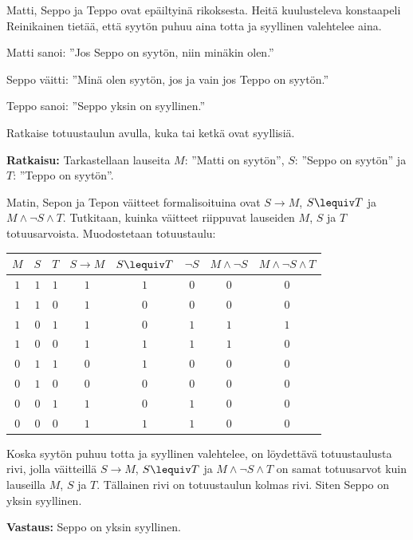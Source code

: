 \begin{esimerkki}
Matti, Seppo ja Teppo ovat epäiltyinä rikoksesta. Heitä kuulusteleva konstaapeli Reinikainen tietää, että syytön puhuu aina totta ja syyllinen valehtelee aina.

Matti sanoi: ''Jos Seppo on syytön, niin minäkin olen.''

Seppo väitti: ''Minä olen syytön, jos ja vain jos Teppo on syytön.''

Teppo sanoi: ''Seppo yksin on syyllinen.'' 

Ratkaise totuustaulun avulla, kuka tai ketkä ovat syyllisiä.

{\bf Ratkaisu:} Tarkastellaan lauseita $M$: ''Matti on syytön'', $S$: ''Seppo on syytön'' ja $T$: ''Teppo on syytön''.

Matin, Sepon ja Tepon väitteet formalisoituina ovat $S\to M$, $S\lequiv T$
ja $M\land \lnot S \land T$. Tutkitaan, kuinka väitteet riippuvat lauseiden $M$, $S$ ja $T$ totuusarvoista. Muodostetaan totuustaulu:

\bigskip

\begin{center}
\begin{tabular}{|c|c|c|c|c|c|c|c|}\hline
$M$ & $S$ & $T$ & $S\to M$ & $S\lequiv T$ & $\lnot S$ & $M\land \lnot S$ & $M\land \lnot S \land T$\\ \hline
$1$ & $1$ & $1$ & $1$ & $1$ & $0$ & $0$ & $0$\\ %
$1$ & $1$ & $0$ & $1$ & $0$ & $0$ & $0$ & $0$\\
$1$ & $0$ & $1$ & $1$ & $0$ & $1$ & $1$ & $1$\\
$1$ & $0$ & $0$ & $1$ & $1$ & $1$ & $1$ & $0$\\
$0$ & $1$ & $1$ & $0$ & $1$ & $0$ & $0$ & $0$\\
$0$ & $1$ & $0$ & $0$ & $0$ & $0$ & $0$ & $0$\\
$0$ & $0$ & $1$ & $1$ & $0$ & $1$ & $0$ & $0$\\
$0$ & $0$ & $0$ & $1$ & $1$ & $1$ & $0$ & $0$ \\ \hline
\end{tabular}
\end{center}

\bigskip

Koska syytön puhuu totta ja syyllinen valehtelee, on löydettävä totuustaulusta rivi, jolla väitteillä $S\to M$, $S\lequiv T$ ja $M \land \lnot S\land T$ on samat totuusarvot kuin lauseilla $M$, $S$ ja $T$. Tällainen rivi on totuustaulun kolmas rivi. Siten Seppo on yksin syyllinen.

{\bf Vastaus:} Seppo on yksin syyllinen.
\end{esimerkki}

